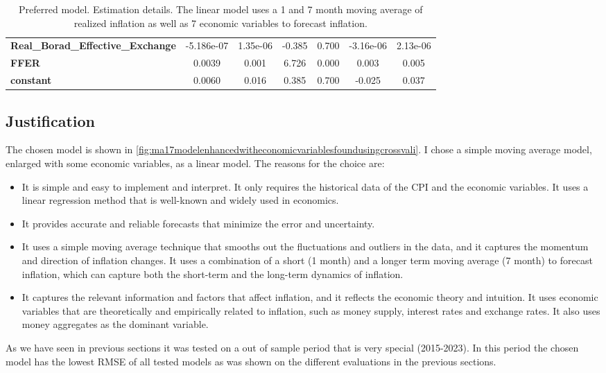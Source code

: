 \documentclass[12pt]{article}
\begin{document}
\begin{adjustwidth}{-2cm}{}
\begin{table}
\begin{tabular}{lcccccc}
\textbf{Real\_Borad\_Effective\_Exchange}                 &   -5.186e-07  &     1.35e-06     &    -0.385  &         0.700        &    -3.16e-06    &     2.13e-06     \\
\textbf{FFER}                                               &       0.0039  &        0.001     &     6.726  &         0.000        &        0.003    &        0.005     \\
\textbf{constant}                                                        &       0.0060  &        0.016     &     0.385  &         0.700        &       -0.025    &        0.037     \\
\bottomrule
\end{tabular}

\caption{Preferred model. Estimation details. The linear model uses a 1 and 7 month moving average of realized inflation as well as 7 economic variables to forecast inflation.}
\label{table:prefmoddet}
\end{table}
\end{adjustwidth}


\subsection{Justification}
The chosen model is shown in \ref{fig:ma17modelenhancedwitheconomicvariablesfoundusingcrossvali}. 
I chose a simple moving average model, enlarged with some economic variables, as a linear model. The reasons for the choice are:
\begin{itemize}
\item It is simple and easy to implement and interpret. It only requires the historical data of the CPI and the economic variables. It uses a linear regression method that is well-known and widely used in economics.
\item It provides accurate and reliable forecasts that minimize the error and uncertainty. 
\item It uses a simple moving average technique that smooths out the fluctuations and outliers in the data, and it captures the momentum and direction of inflation changes. It uses a combination of a short (1 month) and a longer term moving average (7 month) to forecast inflation, which can capture both the short-term and the long-term dynamics of inflation.
\item It captures the relevant information and factors that affect inflation, and it reflects the economic theory and intuition. It uses economic variables that are theoretically and empirically related to inflation, such as money supply, interest rates and exchange rates. It also uses money aggregates as the dominant variable.
\end{itemize}
As we have seen in previous sections it was tested on a out of sample period that is very special (2015-2023). In this period the chosen model has the lowest RMSE of all tested models as was shown on the different evaluations in the previous sections.
\end{document}
